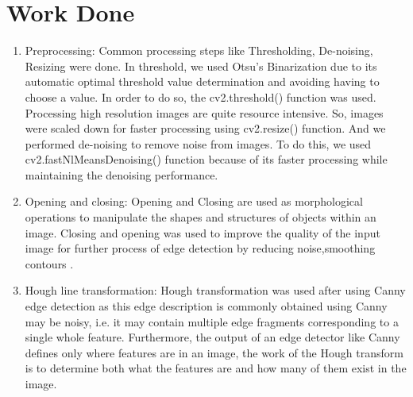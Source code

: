 \section{Work Done}
\begin{enumerate}
    \item Preprocessing: Common processing steps like Thresholding, De-noising, Resizing were done. In threshold, we used Otsu's Binarization due to its automatic optimal threshold value determination and avoiding having to choose a value. In order to do so, the cv2.threshold() function was used. Processing high resolution images are quite resource intensive. So, images were scaled down for faster processing using cv2.resize() function. And we performed de-noising to remove noise from images. To do this, we used cv2.fastNlMeansDenoising() function because of its faster processing while maintaining the denoising performance.
    \item Opening and closing: Opening and Closing are used as morphological operations to manipulate the shapes and structures of objects within an image. Closing and opening was used to improve the quality of the input image for further process of edge detection by reducing noise,smoothing contours . 
    \item Hough line transformation: Hough transformation was used after using Canny edge detection as this edge description is commonly obtained using Canny may be noisy, i.e. it may contain multiple edge fragments corresponding to a single whole feature. Furthermore, the output of an edge detector like Canny defines only where features are in an image, the work of the Hough transform is to determine both what the features are and how many of them exist in the image. 
    \newpage
    \newpage
    \begin{figure}[h]
        \centering
        \begin{minipage}[b]{0.30\linewidth}

\end{minipage}
\end{figure}
\end{enumerate}
